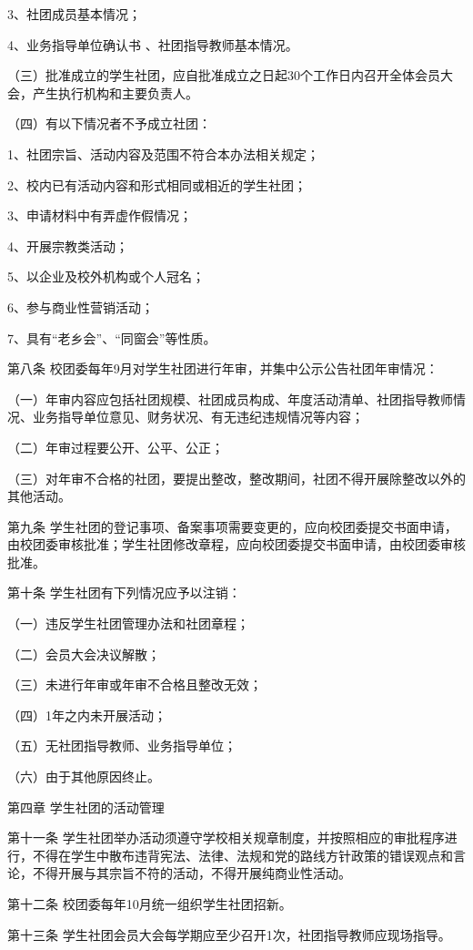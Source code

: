 \documentclass[UTF8,12pt,a4paper]{report}
\begin{document}
3、社团成员基本情况；

4、业务指导单位确认书 、社团指导教师基本情况。

（三）批准成立的学生社团，应自批准成立之日起30个工作日内召开全体会员大会，产生执行机构和主要负责人。

（四）有以下情况者不予成立社团：

1、社团宗旨、活动内容及范围不符合本办法相关规定；

2、校内已有活动内容和形式相同或相近的学生社团；

3、申请材料中有弄虚作假情况；

4、开展宗教类活动；

5、以企业及校外机构或个人冠名；

6、参与商业性营销活动；

7、具有“老乡会”、“同窗会”等性质。

第八条  校团委每年9月对学生社团进行年审，并集中公示公告社团年审情况：

（一）年审内容应包括社团规模、社团成员构成、年度活动清单、社团指导教师情况、业务指导单位意见、财务状况、有无违纪违规情况等内容；

（二）年审过程要公开、公平、公正；

（三）对年审不合格的社团，要提出整改，整改期间，社团不得开展除整改以外的其他活动。

第九条  学生社团的登记事项、备案事项需要变更的，应向校团委提交书面申请，由校团委审核批准；学生社团修改章程，应向校团委提交书面申请，由校团委审核批准。

第十条  学生社团有下列情况应予以注销：

（一）违反学生社团管理办法和社团章程；

（二）会员大会决议解散；

（三）未进行年审或年审不合格且整改无效；

（四）1年之内未开展活动；

（五）无社团指导教师、业务指导单位；

（六）由于其他原因终止。



第四章  学生社团的活动管理

第十一条  学生社团举办活动须遵守学校相关规章制度，并按照相应的审批程序进行，不得在学生中散布违背宪法、法律、法规和党的路线方针政策的错误观点和言论，不得开展与其宗旨不符的活动，不得开展纯商业性活动。

第十二条  校团委每年10月统一组织学生社团招新。

第十三条  学生社团会员大会每学期应至少召开1次，社团指导教师应现场指导。
\end{document}
